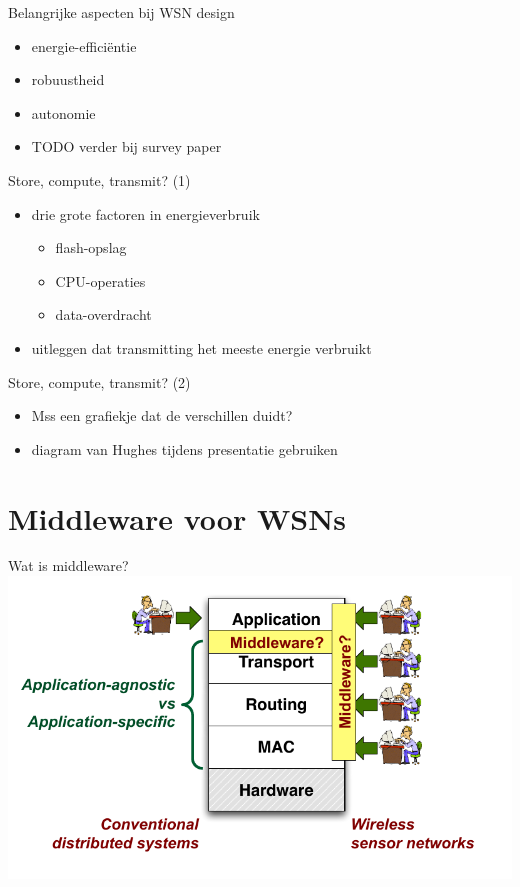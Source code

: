 \documentclass[presentation, bigger]{beamer}
\begin{document}
\begin{frame}[label=sec-1-5]{Belangrijke aspecten bij WSN design}
\begin{itemize}
\item energie-efficiëntie
\item robuustheid
\item autonomie
\item TODO verder bij survey paper
\end{itemize}
\end{frame}

\begin{frame}[label=sec-1-6]{Store, compute, transmit? (1)}
\begin{itemize}
\item drie grote factoren in energieverbruik
\begin{itemize}
\item flash-opslag
\item CPU-operaties
\item data-overdracht
\end{itemize}
\item uitleggen dat transmitting het meeste energie verbruikt
\end{itemize}
\end{frame}

\begin{frame}[label=sec-1-7]{Store, compute, transmit? (2)}
\begin{itemize}
\item Mss een grafiekje dat de verschillen duidt?
\item diagram van Hughes tijdens presentatie gebruiken
\end{itemize}
\end{frame}
\section{Middleware voor WSNs}
\label{sec-2}
\begin{frame}[label=sec-2-1]{Wat is middleware?}
\includegraphics[width=\textwidth,keepaspectration=true]{middleware}
\end{frame}
\end{document}
